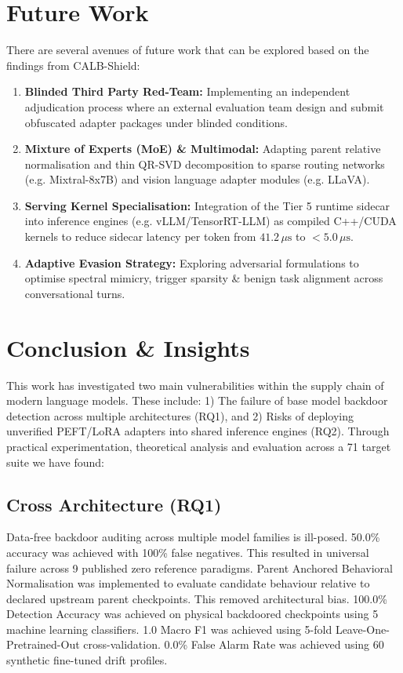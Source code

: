 \documentclass[conference]{IEEEtran}
\begin{document}
\section{Future Work}
\label{sec:future_work}

There are several avenues of future work that can be explored based on the findings from CALB-Shield:
\begin{enumerate}
    \item \textbf{Blinded Third Party Red-Team:} Implementing an independent adjudication process where an external evaluation team design and submit obfuscated adapter packages under blinded conditions.
    \item \textbf{Mixture of Experts (MoE) \& Multimodal:} Adapting parent relative normalisation and thin QR-SVD decomposition to sparse routing networks (e.g. Mixtral-8x7B) and vision language adapter modules (e.g. LLaVA).
    \item \textbf{Serving Kernel Specialisation:} Integration of the Tier 5 runtime sidecar into inference engines (e.g. vLLM/TensorRT-LLM) as compiled C++/CUDA kernels to reduce sidecar latency per token from $41.2\,\mu\text{s}$ to $< 5.0\,\mu\text{s}$.
    \item \textbf{Adaptive Evasion Strategy:} Exploring adversarial formulations to optimise spectral mimicry, trigger sparsity \& benign task alignment across conversational turns.
\end{enumerate}

\section{Conclusion \& Insights}
\label{sec:conclusion}

This work has investigated two main vulnerabilities within the supply chain of modern language models. These include: 1) The failure of base model backdoor detection across multiple architectures (RQ1), and 2) Risks of deploying unverified PEFT/LoRA adapters into shared inference engines (RQ2). Through practical experimentation, theoretical analysis and evaluation across a 71 target suite we have found:

\subsection{Cross Architecture (RQ1)}
Data-free backdoor auditing across multiple model families is ill-posed. 50.0\% accuracy was achieved with 100\% false negatives. This resulted in universal failure across 9 published zero reference paradigms. Parent Anchored Behavioral Normalisation was implemented to evaluate candidate behaviour relative to declared upstream parent checkpoints. This removed architectural bias. 100.0\% Detection Accuracy was achieved on physical backdoored checkpoints using 5 machine learning classifiers. 1.0 Macro F1 was achieved using 5-fold Leave-One-Pretrained-Out cross-validation. 0.0\% False Alarm Rate was achieved using 60 synthetic fine-tuned drift profiles.
\end{document}
